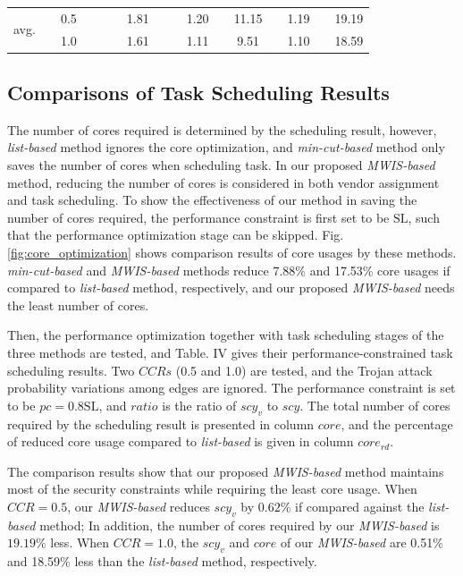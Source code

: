 \documentclass[10pt,journal]{IEEEtran}
\begin{document}
\begin{table}[!t]
\begin{tabular}{c|c|c|c|c|c|c|c|c|c|c|c|c|c|c|c}
\hline
\multicolumn{1}{c|}{\multirow{2}{*}{avg.}}     & &0.5 &      &  &  &1.81     &  & &1.20 &   &11.15  &   &1.19  & &19.19 \\
                                               &  &1.0 &     &  &  &1.61     &  & &1.11 &   &9.51  &    &1.10  &  &18.59 \\

\hline
\hline
\end{tabular}
\label{table:PCTS}
\end{table}





\subsection{Comparisons of Task Scheduling Results}



The number of cores required is determined by the scheduling result, however, \textit{list-based} method ignores the core optimization, and \textit{min-cut-based} method only saves the number of cores when scheduling task. In our proposed \textit{MWIS-based} method, reducing the number of cores is considered in both vendor assignment and task scheduling. To show the effectiveness of our method in saving the number of cores required, the performance constraint is first set to be $\mathrm{SL}$, such that the performance optimization stage can be skipped. Fig. \ref{fig:core_optimization} shows comparison results of core usages by these methods. \textit{min-cut-based} and \textit{MWIS-based} methods reduce 7.88\% and 17.53\% core usages if compared to \textit{list-based} method, respectively, and our proposed \textit{MWIS-based} needs the least number of cores.


Then, the performance optimization together with task scheduling stages of the three methods are tested, and Table. IV gives their performance-constrained task scheduling results. Two $CCRs$ (0.5 and 1.0) are tested, and the Trojan attack probability variations among edges are ignored. The performance constraint is set to be $pc=\mathrm{0.8SL}$, and $ratio$ is the ratio of $scy_v$ to $scy$. The total number of cores required by the scheduling result is presented in column $core$, and the percentage of reduced core usage compared to \textit{list-based} is given in column $core_{rd}$.

The comparison results show that our proposed \textit{MWIS-based} method maintains most of the security constraints while requiring the least core usage. When $CCR=0.5$, our \textit{MWIS-based} reduces $scy_v$ by $0.62\%$ if compared against the \textit{list-based} method; In addition, the number of cores required by our \textit{MWIS-based} is $19.19\%$ less. When $CCR=1.0$, the $scy_v$ and $core$ of our \textit{MWIS-based} are 0.51\% and 18.59\% less than the \textit{list-based} method, respectively.
\end{document}
